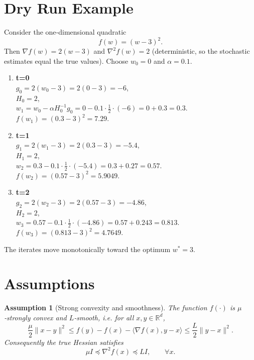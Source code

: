 \documentclass{article}
\newtheorem{assumption}{Assumption}
\begin{document}
\section*{Dry Run Example}
Consider the one‑dimensional quadratic
\[
f(w)= (w-3)^{2}.
\]
Then $\nabla f(w)=2(w-3)$ and $\nabla^{2}f(w)=2$ (deterministic, so the
stochastic estimates equal the true values).  Choose $w_{0}=0$ and
$\alpha=0.1$.

\begin{enumerate}[label={Iteration \arabic*:}, leftmargin=*]
\item \textbf{t=0}\\
    $g_{0}=2(w_{0}-3)=2(0-3)=-6$,\\
    $H_{0}=2$,\\
    $w_{1}=w_{0}-\alpha H_{0}^{-1}g_{0}
          =0-0.1\cdot\frac{1}{2}\cdot(-6)=0+0.3=0.3.$\\
    $f(w_{1})=(0.3-3)^{2}=7.29.$
\item \textbf{t=1}\\
    $g_{1}=2(w_{1}-3)=2(0.3-3)=-5.4$,\\
    $H_{1}=2$,\\
    $w_{2}=0.3-0.1\cdot\frac{1}{2}\cdot(-5.4)=0.3+0.27=0.57.$\\
    $f(w_{2})=(0.57-3)^{2}=5.9049.$
\item \textbf{t=2}\\
    $g_{2}=2(w_{2}-3)=2(0.57-3)=-4.86$,\\
    $H_{2}=2$,\\
    $w_{3}=0.57-0.1\cdot\frac{1}{2}\cdot(-4.86)=0.57+0.243=0.813.$\\
    $f(w_{3})=(0.813-3)^{2}=4.7649.$
\end{enumerate}
The iterates move monotonically toward the optimum $w^{*}=3$.

\section*{Assumptions}
\begin{assumption}[Strong convexity and smoothness]\label{ass:strong}
The function $f(\cdot)$ is $\mu$‑strongly convex and $L$‑smooth, i.e.
for all $x,y\in\mathbb{R}^{d}$,
\[
\frac{\mu}{2}\|x-y\|^{2}\le
f(y)-f(x)-\langle\nabla f(x),y-x\rangle
\le\frac{L}{2}\|y-x\|^{2}.
\]
Consequently the true Hessian satisfies
\[
\mu I\preceq \nabla^{2}f(x)\preceq L I,\qquad\forall x.
\]
\end{assumption}
\end{document}
